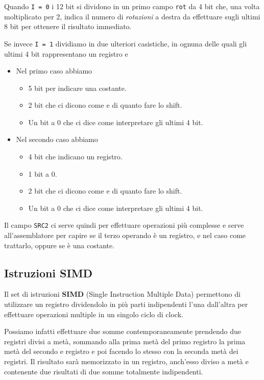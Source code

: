 Quando \verb|I = 0| i 12 bit si dividono in un primo campo \verb|rot| da 4 bit che, una volta
moltiplicato per 2, indica il numero di \emph{rotazioni} a destra da effettuare sugli ultimi 8 bit
per ottenere il risultato immediato.

Se invece \verb|I = 1| dividiamo in due ulteriori casistiche, in ognuna delle quali gli ultimi 4
bit rappresentano un registro e
\begin{itemize}
	\item Nel primo caso abbiamo
	      \begin{itemize}
		      \item 5 bit per indicare una costante.
		      \item 2 bit che ci dicono come e di quanto fare lo shift.
		      \item Un bit a 0 che ci dice come interpretare gli ultimi 4 bit.
	      \end{itemize}
	\item Nel secondo caso abbiamo
	      \begin{itemize}
		      \item 4 bit che indicano un registro.
		      \item 1 bit a 0.
		      \item 2 bit che ci dicono come e di quanto fare lo shift.
		      \item Un bit a 0 che ci dice come interpretare gli ultimi 4 bit.
	      \end{itemize}
\end{itemize}
Il campo \verb|SRC2| ci serve quindi per effettuare operazioni più complesse e serve
all'assemblatore per capire se il terzo operando è un registro, e nel caso come trattarlo, oppure
se è una costante.

\subsection{Istruzioni SIMD}
Il set di istruzioni \textbf{SIMD} (Single Instruction Multiple Data) permettono di utilizzare un
registro dividendolo in più parti indipendenti l'una dall'altra per effettuare operazioni multiple
in un singolo ciclo di clock.

Possiamo infatti effettuare due somme contemporaneamente prendendo due registri divisi a metà,
sommando alla prima metà del primo registro la prima metà del secondo e registro e poi facendo lo
stesso con la seconda metà dei registri. Il risultato sarà memorizzato in un registro, anch'esso
diviso a metà e contenente due risultati di due somme totalmente indipendenti.

